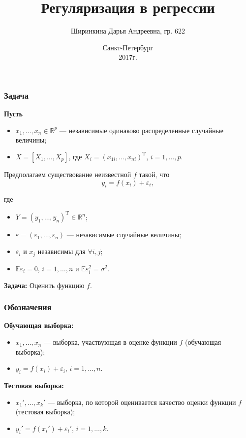 \documentclass[unicode, notheorems]{beamer}
\title{Регуляризация в регрессии}
\author{Ширинкина Дарья Андреевна, гр. 622}
\institute[СПбГУ]{Санкт-Петербургский государственный университет \\
Математико-механический факультет \\
    Статистическое моделирование
    
    \vspace{0.4cm}

    \vspace{0.3cm}
}
\date{
    Санкт-Петербург\\
    2017г.
}
\newcommand{\R}{\mathbb{R}}
\newcommand{\E}{\mathbb{E}}
\newcommand{\T}{\mathrm{T}}
\begin{document}
\begin{frame}
    \titlepage%
\end{frame}



\begin{frame}
\frametitle{Задача}
\textbf{Пусть}
\begin{itemize}
\item $x_1, \ldots, x_n \in \R^p$ --- независимые одинаково распределенные случайные величины; 
\item $X = [X_1, \ldots, X_p]$, где $X_i = (x_{1i}, \ldots, x_{ni})^{\T}$, $i = 1, \ldots, p$.
\end{itemize}
\vspace{0.5cm}
Предполагаем существование неизвестной $f$ такой, что 
\[y_i = f(x_i) + \varepsilon_i,\]

где 
\begin{itemize}
\item $Y = (y_1, \ldots, y_n)^{\T} \in \R^n$;
\item $\varepsilon = (\varepsilon_1, \ldots, \varepsilon_n)$ --- независимые случайные величины;
\item $\varepsilon_i$ и $x_j$ независимы для $\forall i,j$;
\item $\E\varepsilon_i = 0$, $i = 1, \ldots, n$ и $\E\varepsilon_i^2 = \sigma^2$.
\end{itemize}

\vspace{0.5cm}
\textbf{Задача: } Оценить функцию $f$.
\vspace{0.3cm}

\end{frame}


\begin{frame}
\frametitle{Обозначения}

\textbf{Обучающая выборка:}
\begin{itemize}
\item $x_1, \ldots, x_n$ --- выборка, участвующая в оценке функции $f$ (обучающая выборка);
\item $y_i = f(x_i) + \varepsilon_i$, $i = 1, \ldots, n$.  
\end{itemize} 
\vspace{1cm}

\textbf{Тестовая выборка:}
\begin{itemize}
\item $x_1', \ldots, x_k'$ --- выборка, по которой оценивается качество оценки функции $f$ (тестовая выборка);
\item $y_i' = f(x_i') + \varepsilon_i'$, $i = 1, \ldots, k$.  
\end{itemize} 
\end{frame}
\end{document}
